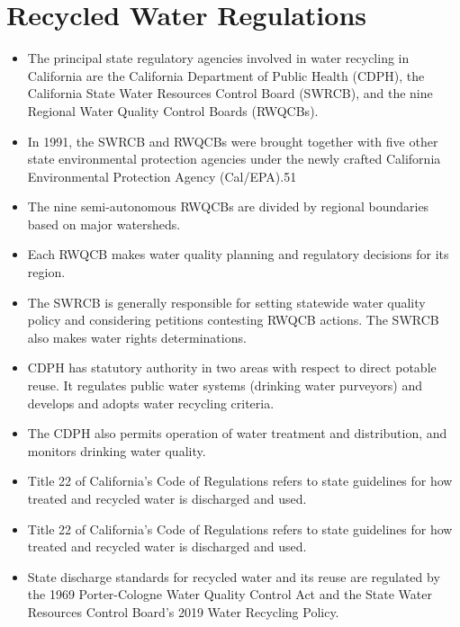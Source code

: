 \section{Recycled Water Regulations}
\begin{itemize}
\item The principal state regulatory agencies involved in water recycling in California are the California Department of Public Health (CDPH), the California State Water Resources Control Board (SWRCB), and the nine Regional Water Quality Control Boards (RWQCBs). 
\item In 1991, the SWRCB and RWQCBs were brought together with five other state environmental protection agencies under the newly crafted California Environmental Protection Agency (Cal/EPA).51
\item The nine semi-autonomous RWQCBs are divided by regional boundaries based on major 
watersheds. 
\item Each RWQCB makes water quality planning and regulatory decisions for its region. 
\item The SWRCB is generally responsible for setting statewide water quality policy and considering petitions contesting RWQCB actions. The SWRCB also makes water rights determinations.\\

\item CDPH has statutory authority in two areas with respect to direct potable reuse. It 
regulates public water systems (drinking water purveyors) and develops and adopts water 
recycling criteria.

\item The CDPH also permits operation of water treatment and distribution, and monitors drinking water quality.\\

\item Title 22 of California’s Code of Regulations refers to state guidelines for how treated and recycled water is discharged and used.\\

\item Title 22 of California’s Code of Regulations refers to state guidelines for how treated and recycled water is discharged and used.\\

\item State discharge standards for recycled water and its reuse are regulated by the 1969 Porter-Cologne Water Quality Control Act and the State Water Resources Control Board’s 2019 Water Recycling Policy.\\


\end{itemize}

